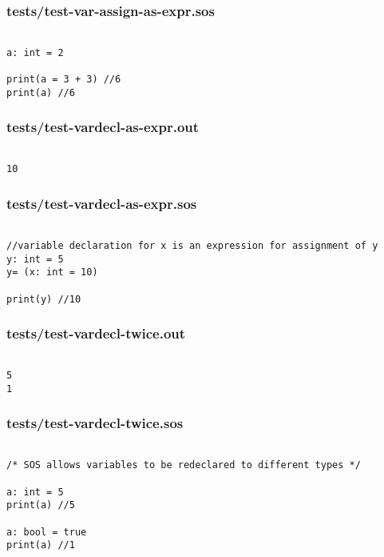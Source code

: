 \documentclass[main.tex]{subfiles}
\begin{document}
\subsubsection{tests/test-var-assign-as-expr.sos}

\begin{lstlisting}

a: int = 2

print(a = 3 + 3) //6
print(a) //6
\end{lstlisting}

\subsubsection{tests/test-vardecl-as-expr.out}

\begin{lstlisting}

10
\end{lstlisting}

\subsubsection{tests/test-vardecl-as-expr.sos}

\begin{lstlisting}

//variable declaration for x is an expression for assignment of y
y: int = 5
y= (x: int = 10)

print(y) //10
\end{lstlisting}

\subsubsection{tests/test-vardecl-twice.out}

\begin{lstlisting}

5
1
\end{lstlisting}

\subsubsection{tests/test-vardecl-twice.sos}

\begin{lstlisting}

/* SOS allows variables to be redeclared to different types */

a: int = 5
print(a) //5

a: bool = true
print(a) //1
\end{lstlisting}
\end{document}
